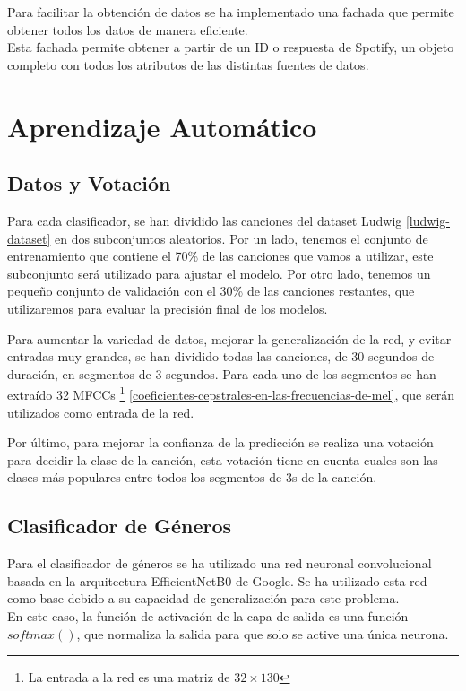 Para facilitar la obtención de datos se ha implementado una fachada que
permite obtener todos los datos de manera eficiente.\\
Esta fachada permite obtener a partir de un ID o respuesta de Spotify,
un objeto completo con todos los atributos de las distintas fuentes de
datos.

\section{Aprendizaje Automático}

\subsection{Datos y Votación}

Para cada clasificador, se han dividido las canciones del dataset Ludwig \ref{ludwig-dataset} en dos subconjuntos aleatorios. Por un lado, tenemos el conjunto de entrenamiento que contiene el 70\% de las canciones que vamos a utilizar, este subconjunto será utilizado para ajustar el modelo. Por otro lado, tenemos un pequeño conjunto de validación con el 30\% de las canciones restantes, que utilizaremos para evaluar la precisión final de los modelos.

Para aumentar la variedad de datos, mejorar la generalización de la red, y evitar entradas muy grandes, se han dividido todas las canciones, de 30 segundos de duración, en segmentos de 3 segundos.
Para cada uno de los segmentos se han extraído 32 MFCCs \footnote{La entrada a la red es una matriz de $32\times130$} \ref{coeficientes-cepstrales-en-las-frecuencias-de-mel}, que serán utilizados como entrada de la red.

Por último, para mejorar la confianza de la predicción se realiza una votación para decidir la clase de la canción, esta votación tiene en cuenta cuales son las clases más populares entre todos los segmentos de 3s de la canción.

\subsection{Clasificador de Géneros}
Para el clasificador de géneros se ha utilizado una red neuronal convolucional basada en la arquitectura EfficientNetB0 \cite{efficientnet} de Google. Se ha utilizado esta red como base debido a su capacidad de generalización para este problema.\\
En este caso, la función de activación de la capa de salida es una función $softmax()$, que normaliza la salida para que solo se active una única neurona. 


